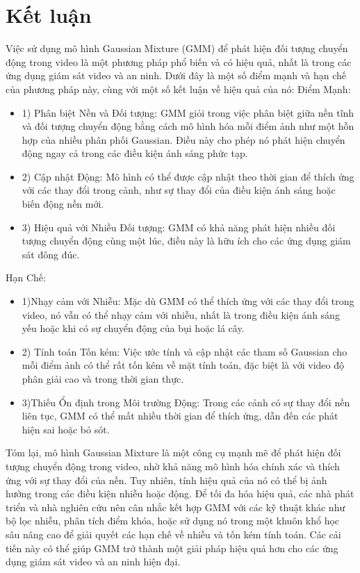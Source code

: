 \documentclass[a4paper]{article}
\begin{document}
\section{Kết luận}
Việc sử dụng mô hình Gaussian Mixture (GMM) để phát hiện đối tượng chuyển động trong video là một phương pháp phổ biến và có hiệu quả, nhất là trong các ứng dụng giám sát video và an ninh. Dưới đây là một số điểm mạnh và hạn chế của phương pháp này, cùng với một số kết luận về hiệu quả của nó:
Điểm Mạnh:
\begin{itemize}[label={}]
    \item 1) Phân biệt Nền và Đối tượng: GMM giỏi trong việc phân biệt giữa nền tĩnh và đối tượng chuyển động bằng cách mô hình hóa mỗi điểm ảnh như một hỗn hợp của nhiều phân phối Gaussian. Điều này cho phép nó phát hiện chuyển động ngay cả trong các điều kiện ánh sáng phức tạp.
    \item 2) Cập nhật Động: Mô hình có thể được cập nhật theo thời gian để thích ứng với các thay đổi trong cảnh, như sự thay đổi của điều kiện ánh sáng hoặc biến động nền mới.
    \item 3) Hiệu quả với Nhiều Đối tượng: GMM có khả năng phát hiện nhiều đối tượng chuyển động cùng một lúc, điều này là hữu ích cho các ứng dụng giám sát đông đúc.
\end{itemize}
Hạn Chế:
\begin{itemize}[label={}]
    \item 1)Nhạy cảm với Nhiễu: Mặc dù GMM có thể thích ứng với các thay đổi trong video, nó vẫn có thể nhạy cảm với nhiễu, nhất là trong điều kiện ánh sáng yếu hoặc khi có sự chuyển động của bụi hoặc lá cây.
    \item 2) Tính toán Tốn kém: Việc ước tính và cập nhật các tham số Gaussian cho mỗi điểm ảnh có thể rất tốn kém về mặt tính toán, đặc biệt là với video độ phân giải cao và trong thời gian thực.
    \item 3)Thiếu Ổn định trong Môi trường Động: Trong các cảnh có sự thay đổi nền liên tục, GMM có thể mất nhiều thời gian để thích ứng, dẫn đến các phát hiện sai hoặc bỏ sót.
\end{itemize}

Tóm lại, mô hình Gaussian Mixture là một công cụ mạnh mẽ để phát hiện đối tượng chuyển động trong video, nhờ khả năng mô hình hóa chính xác và thích ứng với sự thay đổi của nền. Tuy nhiên, tính hiệu quả của nó có thể bị ảnh hưởng trong các điều kiện nhiễu hoặc động. Để tối đa hóa hiệu quả, các nhà phát triển và nhà nghiên cứu nên cân nhắc kết hợp GMM với các kỹ thuật khác như bộ lọc nhiễu, phân tích điểm khóa, hoặc sử dụng nó trong một khuôn khổ học sâu nâng cao để giải quyết các hạn chế về nhiễu và tốn kém tính toán. Các cải tiến này có thể giúp GMM trở thành một giải pháp hiệu quả hơn cho các ứng dụng giám sát video và an ninh hiện đại.
\end{document}
